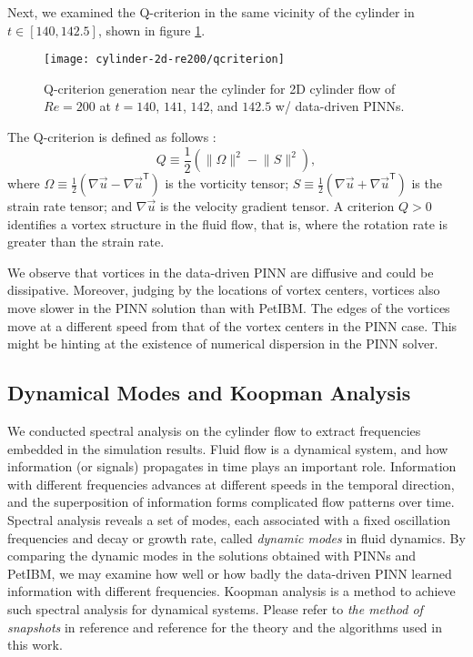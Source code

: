 Next, we examined the Q-criterion in the same vicinity of the cylinder in $t\in[140, 142.5]$, shown in figure \ref{fig:cylinder-re200-pinn-qcriterion}.
\begin{figure}
    \centering%
    \texttt{[image: cylinder-2d-re200/qcriterion]}%
    \caption{%
        Q-criterion generation near the cylinder for 2D cylinder flow of $Re=\num{200}$ at $t=140$, $141$, $142$, and $142.5$ w/ data-driven PINNs.
    }
    \label{fig:cylinder-re200-pinn-qcriterion}%
\end{figure}
The Q-criterion is defined as follows \cite{jeong_identification_1995}:
\begin{equation}
    Q \equiv \frac{1}{2}\left(\lVert \Omega \rVert^2 - \lVert S \rVert^2\right),
\end{equation}
where $\Omega\equiv\frac{1}{2}\left(\nabla\vec{u}-\nabla\vec{u}^\mathsf{T}\right)$ is the vorticity tensor;
$S\equiv\frac{1}{2}\left(\nabla\vec{u}+\nabla\vec{u}^\mathsf{T}\right)$ is the strain rate tensor;
and $\nabla\vec{u}$ is the velocity gradient tensor.
A criterion $Q > 0$ identifies a vortex structure in the fluid flow, that is, where the rotation rate is greater than the strain rate.

We observe that vortices in the data-driven PINN are diffusive and could be dissipative.
Moreover, judging by the locations of vortex centers, vortices also move slower in the PINN solution than with PetIBM.
The edges of the vortices move at a different speed from that of the vortex centers in the PINN case.
This might be hinting at the existence of numerical dispersion in the PINN solver.

\subsection{Dynamical Modes and Koopman Analysis}\label{sec:cylinder-re200-koopman}

We conducted spectral analysis on the cylinder flow to extract frequencies embedded in the simulation results.
Fluid flow is a dynamical system, and how information (or signals) propagates in time plays an important role.
Information with different frequencies advances at different speeds in the temporal direction, and the superposition of information forms complicated flow patterns over time.
Spectral analysis reveals a set of modes, each associated with a fixed oscillation frequencies and decay or growth rate, called {\it dynamic modes} in fluid dynamics.
By comparing the dynamic modes in the solutions obtained with PINNs and PetIBM, we may examine how well or how badly the data-driven PINN learned information with different frequencies.
Koopman analysis is a method to achieve such spectral analysis for dynamical systems.
Please refer to {\it the method of snapshots} in reference \cite{chen_variants_2012} and reference \cite{rowley_spectral_2009} for the theory and the algorithms used in this work.

